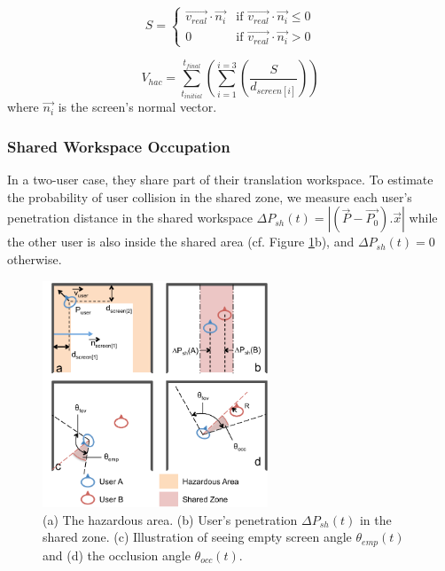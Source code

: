 \begin{equation}
S = 
  \begin{cases}
  \overrightarrow{v_{real}}\cdot\overrightarrow{n_{i}} & \text{if } \overrightarrow{v_{real}}\cdot\overrightarrow{n_{i}} \leq 0 \\
  0 & \text{if } \overrightarrow{v_{real}}\cdot\overrightarrow{n_{i}} > 0
  \end{cases}
\end{equation}

\begin{equation}
V_{hac}=\sum_{t_{initial}}^{t_{final}}\left(\sum_{i=1}^{i=3}\left(\frac{S}{d_{screen[i]}}\right)\right)
\end{equation}
where $\overrightarrow{n_{i}}$ is the screen's normal vector.


\subsubsection{Shared Workspace Occupation}
In a two-user case, they share part of their translation workspace. To estimate the probability of user collision in the shared zone, we measure each user's penetration distance in the shared workspace $\Delta P_{sh}(t)=\left|(\overrightarrow{P}-\overrightarrow{P_{0}}).\overrightarrow{x}\right|$ while the other user is also inside the shared area (cf. Figure \ref{fig:4_metrics}b), and $\Delta P_{sh}(t)=0$ otherwise.

\begin{figure}[tb]
  \centering
  \includegraphics[width=0.6\textwidth]{figures/ch4/cohab_metrics}
  \caption{\label{fig:4_metrics}(a) The hazardous area. (b) User's penetration $\Delta P_{sh}(t)$ in the shared zone. (c) Illustration of seeing empty screen angle $\theta_{emp}(t)$ and (d) the occlusion angle $\theta_{occ}(t)$.}
\end{figure}

